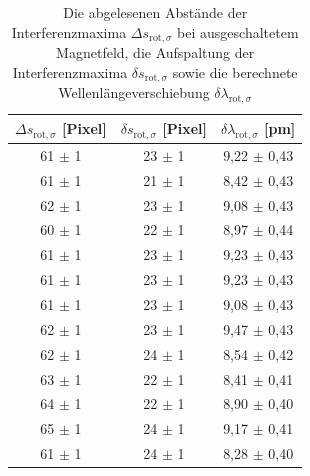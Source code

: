             \begin{table}[h]
                \centering
                \caption{Die abgelesenen Abstände der Interferenzmaxima $\Delta s_{\text{rot}, \sigma}$ bei ausgeschaltetem Magnetfeld, die Aufspaltung der Interferenzmaxima $\delta s_{\text{rot}, \sigma}$ sowie die berechnete Wellenlängeverschiebung $\delta \lambda_{\text{rot}, \sigma}$}
                \label{tab:rot_sigma}
              
                \begin{tabular}{c c c}
                  \toprule
                  {$\Delta s_{\text{rot}, \sigma}$ [Pixel]} & {$\delta s_{\text{rot}, \sigma}$ [Pixel]} & {$\delta \lambda_{\text{rot}, \sigma}$ [\si{\pico\metre}]} \\ 
                  \midrule
                   61 $\pm$ 1  &   23 $\pm$ 1   &   9,22 $\pm$ 0,43   \\
                   61 $\pm$ 1  &   21 $\pm$ 1   &   8,42 $\pm$ 0,43   \\
                   62 $\pm$ 1  &   23 $\pm$ 1   &   9,08 $\pm$ 0,43   \\
                   60 $\pm$ 1  &   22 $\pm$ 1   &   8,97 $\pm$ 0,44   \\
                   61 $\pm$ 1  &   23 $\pm$ 1   &   9,23 $\pm$ 0,43   \\
                   61 $\pm$ 1  &   23 $\pm$ 1   &   9,23 $\pm$ 0,43   \\
                   61 $\pm$ 1  &   23 $\pm$ 1   &   9,08 $\pm$ 0,43   \\
                   62 $\pm$ 1  &   23 $\pm$ 1   &   9,47 $\pm$ 0,43   \\
                   62 $\pm$ 1  &   24 $\pm$ 1   &   8,54 $\pm$ 0,42   \\
                   63 $\pm$ 1  &   22 $\pm$ 1   &   8,41 $\pm$ 0,41   \\
                   64 $\pm$ 1  &   22 $\pm$ 1   &   8,90 $\pm$ 0,40   \\
                   65 $\pm$ 1  &   24 $\pm$ 1   &   9,17 $\pm$ 0,41   \\
                   61 $\pm$ 1  &   24 $\pm$ 1   &   8,28 $\pm$ 0,40   \\

                  \bottomrule
                \end{tabular}
              \end{table}
              \FloatBarrier

        \newpage
